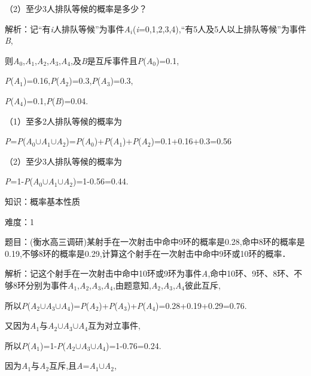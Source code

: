 \documentclass{article} %
\begin{document}
（2）至少3人排队等候的概率是多少？

解析：记``有\textit{i}人排队等候''为事件\textit{A${}_{i}$}(\textit{i}=0,1,2,3,4),``有5人及5人以上排队等候''为事件\textit{B},

则\textit{A}${}_{0}$,\textit{A}${}_{1}$,\textit{A}${}_{2}$,\textit{A}${}_{3}$,\textit{A}${}_{4}$,及\textit{B}是互斥事件且\textit{P}(\textit{A}${}_{0}$)=0.1,

\textit{P}(\textit{A}${}_{1}$)=0.16,\textit{P}(\textit{A}${}_{2}$)=0.3,\textit{P}(\textit{A}${}_{3}$)=0.3,

\textit{P}(\textit{A}${}_{4}$)=0.1,\textit{P}(\textit{B})=0.04.

（1）至多2人排队等候的概率为

\textit{P}=\textit{P}(\textit{A}${}_{0}$$\mathrm{\cup}$\textit{A}${}_{1}$$\mathrm{\cup}$\textit{A}${}_{2}$)=\textit{P}(\textit{A}${}_{0}$)+\textit{P}(\textit{A}${}_{1}$)+\textit{P}(\textit{A}${}_{2}$)=0.1+0.16+0.3=0.56

（2）至少3人排队等候的概率为

\textit{P}=1-\textit{P}(\textit{A}${}_{0}$$\mathrm{\cup}$\textit{A}${}_{1}$$\mathrm{\cup}$\textit{A}${}_{2}$)=1-0.56=0.44.

知识：概率基本性质

难度：1

题目：(衡水高三调研)某射手在一次射击中命中9环的概率是0.28,命中8环的概率是0.19,不够8环的概率是0.29,计算这个射手在一次射击中命中9环或10环的概率．

解析：记这个射手在一次射击中命中10环或9环为事件\textit{A},命中10环、9环、8环、不够8环分别为事件\textit{A}${}_{1}$,\textit{A}${}_{2}$,\textit{A}${}_{3}$,\textit{A}${}_{4}$,由题意知,\textit{A}${}_{2}$,\textit{A}${}_{3}$,\textit{A}${}_{4}$彼此互斥,

所以\textit{P}(\textit{A}${}_{2}$$\mathrm{\cup}$\textit{A}${}_{3}$$\mathrm{\cup}$\textit{A}${}_{4}$)=\textit{P}(\textit{A}${}_{2}$)+\textit{P}(\textit{A}${}_{3}$)+\textit{P}(\textit{A}${}_{4}$)=0.28+0.19+0.29=0.76.

又因为\textit{A}${}_{1}$与\textit{A}${}_{2}$$\mathrm{\cup}$\textit{A}${}_{3}$$\mathrm{\cup}$\textit{A}${}_{4}$互为对立事件,

所以\textit{P}(\textit{A}${}_{1}$)=1-\textit{P}(\textit{A}${}_{2}$$\mathrm{\cup}$\textit{A}${}_{3}$$\mathrm{\cup}$\textit{A}${}_{4}$)=1-0.76=0.24.

因为\textit{A}${}_{1}$与\textit{A}${}_{2}$互斥,且\textit{A}=\textit{A}${}_{1}$$\mathrm{\cup}$\textit{A}${}_{2}$,
\end{document}
